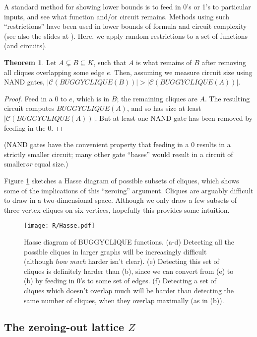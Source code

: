 \documentclass[12pt]{article}
\theoremstyle{definition}
\newtheorem{thm}{Theorem}[section]
\newcommand{\bigC}[0]{\mathcal{C}}
\begin{document}
A standard method for showing lower bounds is to feed in 0's or
1's to particular inputs, and see what function and/or circuit remains.
Methods using such ``restrictions'' have been used in lower bounds of formula
\cite{subbotovskaya1963comparison} and circuit \cite{hastad1987lower}
complexity (see also the slides at \cite{rossmanRestrictions}).
Here, we apply random restrictions to a set of functions (and circuits).

\begin{thm}
\label{edgeZonking}
Let $A \subsetneq B \subseteq K$, such that $A$ is what remains
of $B$ after removing all cliques overlapping some edge $e$.
Then, assuming we measure circuit size using NAND gates,
 $|\bigC(BUGGYCLIQUE(B))| > |\bigC(BUGGYCLIQUE(A))|$.
\end{thm}
\begin{proof}
Feed in a 0 to $e$, which is in $B$; the remaining cliques are $A$.
The resulting
circuit computes $BUGGYCLIQUE(A)$, and so has size
at least $|\bigC(BUGGYCLIQUE(A))|$. But at least one
NAND gate has been removed by feeding in the 0.
\end{proof}

(NAND gates have the convenient property that feeding in a 0
results in a strictly smaller circuit; many other gate ``bases'' would
result in a circuit of smaller{\em or} equal size.)

Figure \ref{fig:Hasse}
sketches a Hasse diagram of possible subsets of cliques,
which shows some of the implications of this ``zeroing'' argument.
Cliques are arguably difficult to draw in a two-dimensional space.
Although we only draw a few subsets of three-vertex cliques
on six vertices, hopefully this provides some
intuition.

\begin{figure}
\centering
\texttt{[image: R/Hasse.pdf]}
\caption{Hasse diagram of BUGGYCLIQUE functions.
(a-d) 
Detecting all the possible cliques in larger graphs will be
increasingly difficult (although {\em how much} harder isn't clear).
(e) 
Detecting this set of cliques is definitely harder than (b),
since we can convert from (e) to (b) by feeding in 0's to
some set of edges.
(f) Detecting a set of cliques which doesn't overlap much will be
harder than detecting the same number of cliques, when they overlap
maximally (as in (b)).}
\label{fig:Hasse}
\end{figure}

\subsection{The zeroing-out lattice $Z$}
\end{document}
